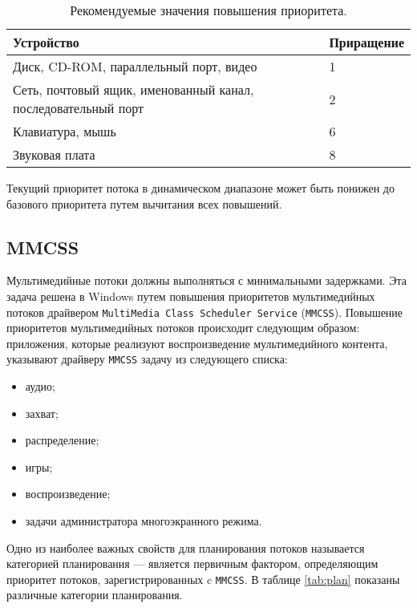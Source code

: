 \documentclass[a4paper,12pt]{bmstu}
\begin{document}
\begin{table}[h]
    \caption{Рекомендуемые значения повышения приоритета.}
    \begin{center}
        \begin{tabular}{|p{100mm}|l|}
            \hline
            \textbf{Устройство} & \textbf{Приращение} \\
            \hline
            Диск, CD-ROM, параллельный порт, видео & 1 \\
            \hline
            Сеть, почтовый ящик, именованный канал, последовательный порт & 2 \\
            \hline
            Клавиатура, мышь & 6 \\
            \hline
            Звуковая плата & 8 \\
            \hline
        \end{tabular}
    \end{center}
    \label{tab:io}
\end{table}

Текущий приоритет потока в динамическом диапазоне может быть понижен до базового приоритета путем вычитания всех повышений.

\subsection{MMCSS}

Мультимедийные потоки должны выполняться с минимальными задержками. Эта задача решена в Windows путем повышения приоритетов мультимедийных потоков драйвером \texttt{MultiMedia Class Scheduler Service} (\texttt{MMCSS}). Повышение приоритетов мультимедийных потоков происходит следующим образом: приложения, которые реализуют воспроизведение мультимедийного контента, указывают драйверу \texttt{MMCSS} задачу из следующего списка:

\begin{itemize}
    \item аудио;
    \item захват;
    \item распределение;
    \item игры;
    \item воспроизведение;
    \item задачи администратора многоэкранного режима.
\end{itemize}

Одно из наиболее важных свойств для планирования потоков называется категорией планирования --- является первичным фактором, определяющим приоритет потоков, зарегистрированных c \texttt{MMCSS}. В таблице \ref{tab:plan} показаны различные категории планирования.
\end{document}
